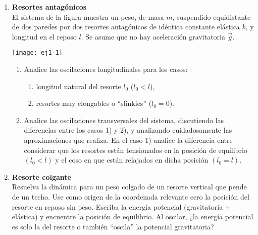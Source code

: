 \documentclass[11pt,spanish,a4paper]{article}
\begin{document}
\begin{enumerate}
\item
\begin{minipage}[t][1.9cm]{0.7\textwidth}
\textbf{Resortes antagónicos}\\
El sistema de la figura muestra un peso, de masa $m$, suspendido equidistante de dos paredes por dos resortes antagónicos de idéntica constante elástica $k$, y longitud en el reposo $l$.
Se asume que no hay aceleración gravitatoria $\vec{g}$.
\end{minipage}
\begin{minipage}[c][0cm][t]{0.25\textwidth}
  \texttt{[image: ej1-1]}
\end{minipage}
\begin{enumerate}
	\item Analice las oscilaciones longitudinales para los casos:   
	\begin{enumerate}
		\item longitud natural del resorte $l_0$ ($l_0 < l$),   
		\item resortes muy elongables o ``slinkies'' ($l_0 = 0$).   
	\end{enumerate}
	\item Analice las oscilaciones transversales del sistema, discutiendo las diferencias entre los casos 1) y 2), y analizando cuidadosamente las aproximaciones que realiza.
	En el caso 1) analice la diferencia entre considerar que los resortes están tensionados en la posición de equilibrio $(l_{0}<l)$ y el coso en que están relajados en dicha posición $(l_0= l)$.
\end{enumerate}



\item 
\textbf{Resorte colgante}\\
Resuelva la dinámica para un peso colgado de un resorte vertical que pende de un techo.
Use como origen de la coordenada relevante cero la posición del resorte en reposo sin peso.
Escriba la energía potencial (gravitatoria + elástica) y encuentre la posición de equilibrio.
Al oscilar, ¿la energía potencial es solo la del resorte o también ``oscila'' la potencial gravitatoria?



\end{enumerate}
\end{document}
